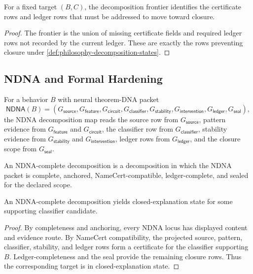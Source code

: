 \begin{theorem}
\label{thm:philosophy-frontier-gives-decomposition-route}
For a fixed target $(B,C)$, the decomposition frontier identifies the
certificate rows and ledger rows that must be addressed to move toward
closure.
\end{theorem}
\begin{proof}
The frontier is the union of missing certificate fields and required
ledger rows not recorded by the current ledger. These are exactly the
rows preventing closure under
\autoref{def:philosophy-decomposition-states}.
\end{proof}

\subsection{NDNA and Formal Hardening}
\label{subsec:philosophy-decomposition-ndna-hardening}

\begin{definition}
\label{def:philosophy-ndna-decomposition-map}
For a behavior $B$ with neural theorem-DNA packet
$$
\mathsf{NDNA}(B)
=
(G_{\mathsf{source}},
G_{\mathsf{feature}},
G_{\mathsf{circuit}},
G_{\mathsf{classifier}},
G_{\mathsf{stability}},
G_{\mathsf{intervention}},
G_{\mathsf{ledger}},
G_{\mathsf{seal}}),
$$
the NDNA decomposition map reads the source row from
$G_{\mathsf{source}}$, pattern evidence from
$G_{\mathsf{feature}}$ and $G_{\mathsf{circuit}}$, the classifier row
from $G_{\mathsf{classifier}}$, stability evidence from
$G_{\mathsf{stability}}$ and $G_{\mathsf{intervention}}$, ledger rows
from $G_{\mathsf{ledger}}$, and the closure scope from
$G_{\mathsf{seal}}$.
\end{definition}

\begin{definition}
\label{def:philosophy-ndna-complete-decomposition}
An NDNA-complete decomposition is a decomposition in which the NDNA
packet is complete, anchored, NameCert-compatible, ledger-complete, and
sealed for the declared scope.
\end{definition}

\begin{theorem}
\label{thm:philosophy-ndna-complete-decomposition-yields-bedc-closure}
An NDNA-complete decomposition yields closed-explanation state for some
supporting classifier candidate.
\end{theorem}
\begin{proof}
By completeness and anchoring, every NDNA locus has displayed content and
evidence route. By NameCert compatibility, the projected source,
pattern, classifier, stability, and ledger rows form a certificate for
the classifier supporting $B$. Ledger-completeness and the seal provide
the remaining closure rows. Thus the corresponding target is in
closed-explanation state.
\end{proof}

